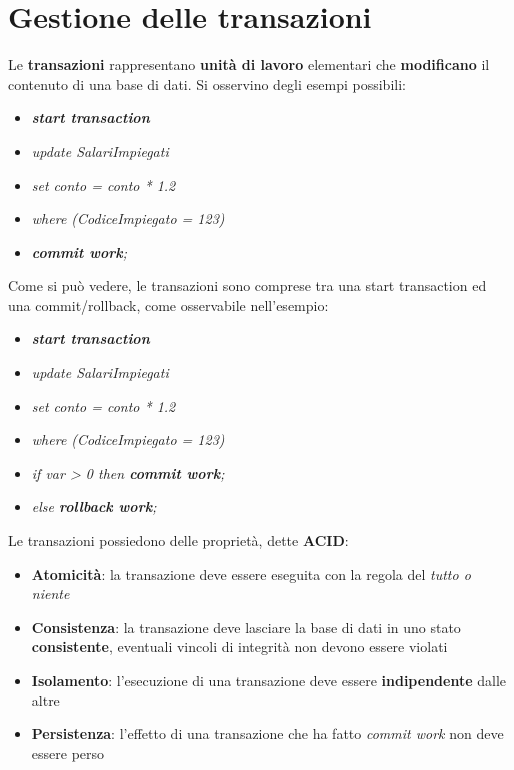 \documentclass{article}
\begin{document}
\pagestyle{empty}

\section*{Gestione delle transazioni} 
\large

Le \textbf{transazioni} rappresentano \textbf{unità di lavoro} elementari che \textbf{modificano} il contenuto di una base di dati. Si osservino degli esempi possibili:
\begin{itemize}[label={ }, leftmargin=1cm]
    \item \textit{\textbf{start transaction}}
    \item \textit{update SalariImpiegati}
    \item \textit{set conto = conto * 1.2}
    \item \textit{where (CodiceImpiegato = 123)}
    \item \textit{\textbf{commit work};}
\end{itemize}
Come si può vedere, le transazioni sono comprese tra una start transaction ed una commit/rollback, come osservabile nell'esempio:
\begin{itemize}[label={ }, leftmargin=1cm]
    \item \textit{\textbf{start transaction}}
    \item \textit{update SalariImpiegati}
    \item \textit{set conto = conto * 1.2}
    \item \textit{where (CodiceImpiegato = 123)}
    \item \textit{if var > 0 then \textbf{commit work};}
    \item \textit{else \textbf{rollback work};}\\
\end{itemize}
Le transazioni possiedono delle proprietà, dette \textbf{ACID}:
\begin{itemize}[label={-}, leftmargin=1cm]
    \item \textbf{Atomicità}: la transazione deve essere eseguita con la regola del \textit{tutto o niente}
    \item \textbf{Consistenza}: la transazione deve lasciare la base di dati in uno stato \textbf{consistente}, eventuali vincoli di integrità non devono essere violati
    \item \textbf{Isolamento}: l'esecuzione di una transazione deve essere \textbf{indipendente} dalle altre
    \item \textbf{Persistenza}: l'effetto di una transazione che ha fatto \textit{commit work} non deve essere perso
\end{itemize}
\end{document}
